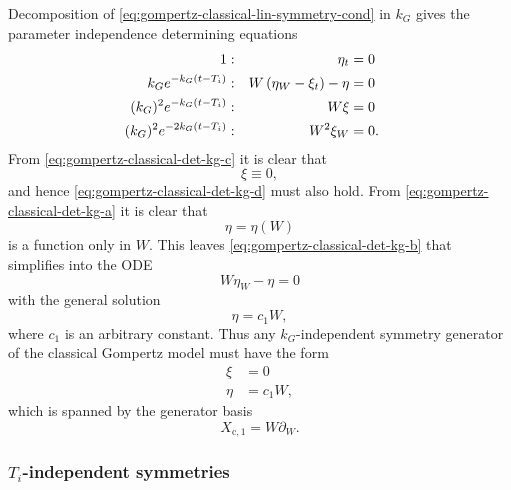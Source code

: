 Decomposition of \cref{eq:gompertz-classical-lin-symmetry-cond} in \(k_G\) gives the parameter independence determining equations
\begin{subequations}
  \begin{flalign}
    1 & : & \eta_t &= 0 && \FlLabel{eq:gompertz-classical-det-kg-a}\\
    k_G e^{-k_G (t - T_i)} & : & W \left(\eta_W - \xi_t\right) - \eta &= 0 && \FlLabel{eq:gompertz-classical-det-kg-b}\\
    (k_G)^2 e^{-k_G (t - T_i)} & : & W \xi &= 0 && \FlLabel{eq:gompertz-classical-det-kg-c}\\
    (k_G)^2 e^{-2k_G (t - T_i)} & : & W^2 \xi_W &= 0. && \FlLabel{eq:gompertz-classical-det-kg-d}
  \end{flalign}
\end{subequations}
From \cref{eq:gompertz-classical-det-kg-c} it is clear that
\begin{equation}
  \xi \equiv 0,
\end{equation}
and hence \cref{eq:gompertz-classical-det-kg-d} must also hold.
From \cref{eq:gompertz-classical-det-kg-a} it is clear that
\begin{equation}
  \eta = \eta(W)
\end{equation}
is a function only in \(W\).
This leaves \cref{eq:gompertz-classical-det-kg-b} that simplifies into the ODE
\begin{equation}
  W \eta_W - \eta = 0
\end{equation}
with the general solution
\begin{equation}
  \eta = c_1 W,
\end{equation}
where \(c_1\) is an arbitrary constant.
Thus any \(k_G\)-independent symmetry generator of the classical Gompertz model  must have the form
\begin{align}
  \xi &= 0 \\
  \eta &= c_1 W,
\end{align}
which is spanned by the generator basis
\begin{equation}
  X_{\text{c},1} = W \partial_W.
\end{equation}

\subsubsection{\texorpdfstring{\(T_i\)-independent symmetries}{Inflection time-independent symmetries}}

